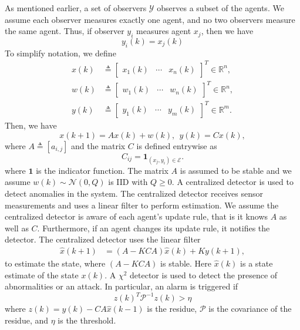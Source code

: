 \documentclass[letterpaper, 10 pt, conference]{ieeeconf}
\begin{document}
As mentioned earlier, a set of observers $\mathcal{Y}$ observes a subset of the agents. We assume each observer measures exactly one agent, and no two observers measure the same agent. Thus, if observer $y_i$ measures agent $x_j$, then we have
\begin{equation}
y_i(k) = x_j(k) 
\end{equation}
To simplify notation, we define
\begin{align*}
 x(k) &\triangleq \begin{bmatrix} x_1(k) & \cdots & x_n(k) \end{bmatrix}^T \in \mathbb{R}^n, \\
 w(k) &\triangleq \begin{bmatrix} w_1(k) & \cdots & w_n(k) \end{bmatrix}^T \in \mathbb{R}^n, \\
y(k) &\triangleq \begin{bmatrix} y_1(k) & \cdots & y_m(k) \end{bmatrix}^T \in \mathbb{R}^m. 
\end{align*}
Then, we have 
\begin{equation}
x(k+1) = Ax(k) + w(k), ~~ y(k) = Cx(k),
\end{equation}
where $A \triangleq [a_{i,j}]$ and the matrix $C$ is defined entrywise as
\begin{equation}
C_{ij} = \mathbf{1}_{(x_j,y_i) \in \mathcal{E}}.
\end{equation}
where $\mathbf{1}$ is the indicator function. The matrix $A$ is assumed to be stable and we assume $w(k) \sim \mathcal{N}(0,Q)$ is IID with $Q \ge 0$. A centralized detector is used to detect anomalies in the system. The centralized detector receives sensor measurements and uses a linear filter to perform estimation. We assume the centralized detector is aware of each agent's update rule, that is it knows $A$ as well as $C$. Furthermore, if an agent changes its update rule, it notifies the detector. The centralized detector uses the linear filter 
\begin{align}
\hat{x}(k+1) &= (A-KCA)\hat{x}(k) + Ky(k+1), 
\end{align}
to estimate the state, where $(A-KCA)$ is stable. Here $\hat{x}(k)$ is a state estimate of the state $x(k)$. A $\chi^2$ detector is used to detect the presence of abnormalities or an attack. In particular, an alarm is triggered if 
\begin{equation}
z(k)^T\mathcal{P}^{-1}z(k) > \eta
\end{equation}
where $z(k) = y(k) - CA\hat{x}(k-1)$ is the residue, $\mathcal{P}$ is the covariance of the residue, and $\eta$ is the threshold.
\end{document}
